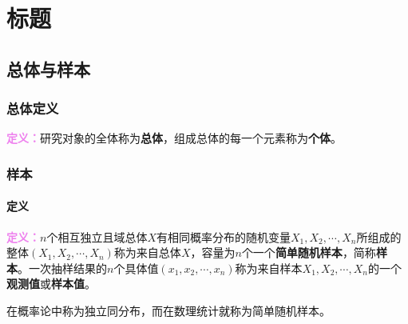 \setcounter{tocdepth}{4}
\setcounter{secnumdepth}{4}
\renewcommand{\baselinestretch}{1.5}
\usepackage{multirow}
\newcommand{\tabincell}[2]{
\begin{tabular}{@{}#1@{}}#2\end{tabular}
}
\usepackage{graphicx}
\chapter{标题}
\section{总体与样本}

\subsection{总体定义}

\textcolor{violet}{\textbf{定义：}}研究对象的全体称为\textbf{总体}，组成总体的每一个元素称为\textbf{个体}。

\subsection{样本}

\subsubsection{定义}

\textcolor{violet}{\textbf{定义：}}$n$个相互独立且域总体$X$有相同概率分布的随机变量$X_1,X_2,\cdots,X_n$所组成的整体$(X_1,X_2,\cdots,X_n)$称为来自总体$X$，容量为$n$个一个\textbf{简单随机样本}，简称\textbf{样本}。一次抽样结果的$n$个具体值$(x_1,x_2,\cdots,x_n)$称为来自样本$X_1,X_2,\cdots,X_n$的一个\textbf{观测值}或\textbf{样本值}。

在概率论中称为独立同分布，而在数理统计就称为简单随机样本。

